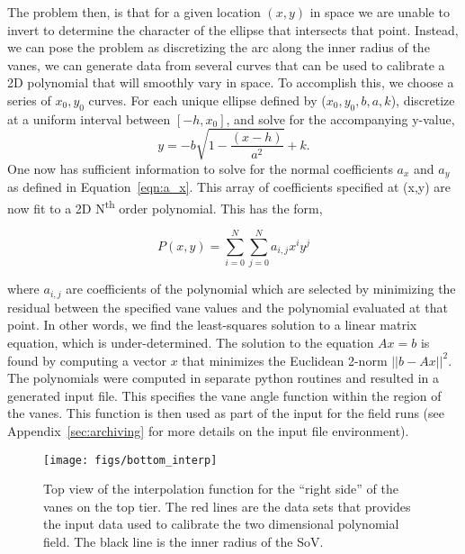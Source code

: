 The problem then, is that for a given location $(x,y)$ in space we are
unable to invert to determine the character of the ellipse that
intersects that point. Instead, we can pose the problem as discretizing
the arc along the inner radius of the vanes, we can generate data from
several curves that can be used to calibrate a 2D polynomial that will
smoothly vary in space. To accomplish this, we choose a series of
$x_0,y_0$ curves. For each unique ellipse defined by ($x_0,y_0,b,a,k$),
discretize at a uniform interval between $\left[-h,x_0\right]$, and
solve for the accompanying y-value, 
\begin{equation}
 y = -b \sqrt{1-\frac{(x-h)}{a^2}} + k. 
\end{equation}
One now has sufficient information to solve for the normal coefficients
$a_x$ and $a_y$ as defined in Equation~\ref{eqn:a_x}. This array of
coefficients specified at (x,y) are now fit to a 2D N\textsuperscript{th}
order polynomial. This has the form, 

\begin{equation}
 P(x,y) = \sum_{i=0}^N  \sum_{j=0}^N a_{i,j} x^i y^j
\end{equation}

where $a_{i,j}$ are coefficients of the polynomial which are selected by
minimizing the residual between the specified vane values and the
polynomial evaluated at that point. In other words, we find the
least-squares solution to a linear matrix equation, which is
under-determined. The solution to the equation $A x = b$ is found by
computing a vector $x$ that minimizes the Euclidean 2-norm $|| b - A x
||^2$. The polynomials were computed in separate python routines and
resulted in a generated input file. This specifies the vane angle
function within the region of the vanes. This function is then used as
part of the input for the field runs (see Appendix~\ref{sec:archiving}
for more details on the input file environment). 
%
%

 \begin{figure}[!htb]
  \begin{center}
   \texttt{[image: figs/bottom\_interp]}
   \caption{Top view of the interpolation function for the ``right
   side'' of the vanes on the top tier. The red lines are the data sets
   that provides the input data used to calibrate the two dimensional
   polynomial field. The black line is the inner radius of the SoV.}
   \label{fig:bottom_interp}
  \end{center}
 \end{figure}

